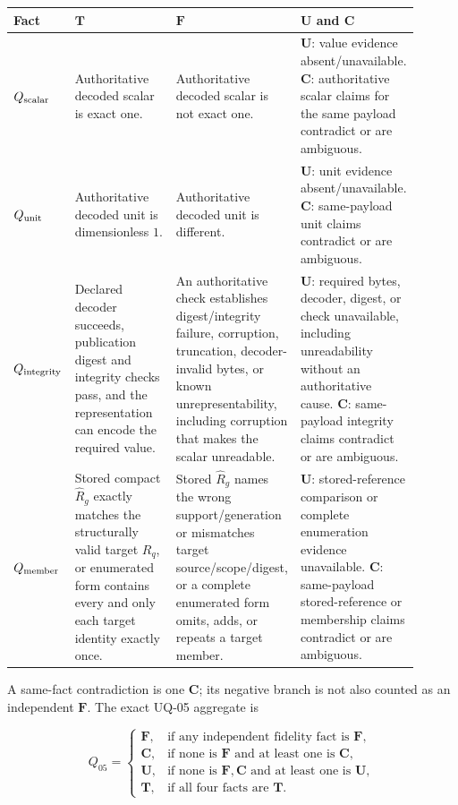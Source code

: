 \begin{longtable}{p{0.13\linewidth}p{0.25\linewidth}p{0.25\linewidth}p{0.27\linewidth}}
\toprule
Fact & \(\mathbf T\) & \(\mathbf F\) & \(\mathbf U\) and \(\mathbf C\)\\
\midrule
\endhead
\(Q_{\rm scalar}\) & Authoritative decoded scalar is exact one. &
Authoritative decoded scalar is not exact one. & \(\mathbf U\): value evidence
absent/unavailable. \(\mathbf C\): authoritative scalar claims for the same
payload contradict or are ambiguous.\\
\(Q_{\rm unit}\) & Authoritative decoded unit is dimensionless \(1\). &
Authoritative decoded unit is different. & \(\mathbf U\): unit evidence
absent/unavailable. \(\mathbf C\): same-payload unit claims contradict or are
ambiguous.\\
\(Q_{\rm integrity}\) & Declared decoder succeeds, publication digest and
integrity checks pass, and the representation can encode the required value. &
An authoritative check establishes digest/integrity failure, corruption,
truncation, decoder-invalid bytes, or known unrepresentability, including
corruption that makes the scalar unreadable. & \(\mathbf U\): required bytes,
decoder, digest, or check unavailable, including unreadability without an
authoritative cause. \(\mathbf C\): same-payload integrity claims contradict
or are ambiguous.\\
\(Q_{\rm member}\) & Stored compact \(\widehat R_g\) exactly matches the
structurally valid target \(R_q\), or enumerated form contains every and only
each target identity exactly once. & Stored \(\widehat R_g\) names the wrong
support/generation or mismatches target source/scope/digest, or a complete
enumerated form omits, adds, or repeats a target member. & \(\mathbf U\):
stored-reference comparison or complete enumeration evidence unavailable.
\(\mathbf C\): same-payload stored-reference or membership claims contradict
or are ambiguous.\\
\bottomrule
\end{longtable}

A same-fact contradiction is one \(\mathbf C\); its negative branch is not
also counted as an independent \(\mathbf F\). The exact UQ-05 aggregate is

\[
Q_{05}=
\begin{cases}
\mathbf F,&\text{if any independent fidelity fact is }\mathbf F,\\
\mathbf C,&\text{if none is }\mathbf F\text{ and at least one is }\mathbf C,\\
\mathbf U,&\text{if none is }\mathbf F,\mathbf C\text{ and at least one is }\mathbf U,\\
\mathbf T,&\text{if all four facts are }\mathbf T.
\end{cases}
\]


